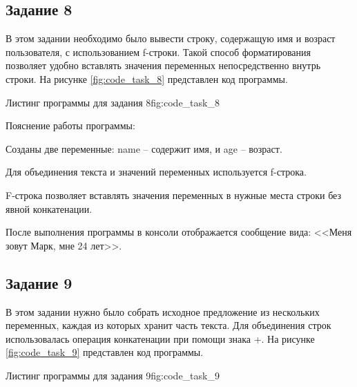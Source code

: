 \documentclass[]{vvsu}
\begin{document}
\subsection{Задание 8}

В этом задании необходимо было вывести строку, содержащую имя и возраст пользователя, с использованием f-строки.  
Такой способ форматирования позволяет удобно вставлять значения переменных непосредственно внутрь строки.  
На рисунке \ref{fig:code_task_8} представлен код программы.

\begin{vvsu_figure}{Листинг программы для задания 8}{fig:code_task_8}
  \begin{minipage}{.75\textwidth}
    
  \end{minipage}
\end{vvsu_figure}

Пояснение работы программы:
\begin{vvsu_list}
  \item Созданы две переменные: name -- содержит имя, и age -- возраст.
  \item Для объединения текста и значений переменных используется f-строка.
  \item F-строка позволяет вставлять значения переменных в нужные места строки без явной конкатенации.
\end{vvsu_list}

После выполнения программы в консоли отображается сообщение вида:  
<<Меня зовут Марк, мне 24 лет>>.

\subsection{Задание 9}

В этом задании нужно было собрать исходное предложение из нескольких переменных, каждая из которых хранит часть текста.  
Для объединения строк использовалась операция конкатенации при помощи знака +.  
На рисунке \ref{fig:code_task_9} представлен код программы.

\begin{vvsu_figure}{Листинг программы для задания 9}{fig:code_task_9}
  \begin{minipage}{.75\textwidth}
    
  \end{minipage}
\end{vvsu_figure}
\end{document}
